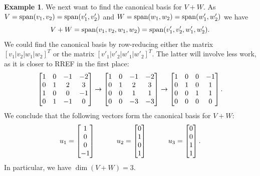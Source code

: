 \documentclass[reqno]{amsart}
\theoremstyle{definition}
\newtheorem{example}[theorem]{Example}
\begin{document}
\begin{example}
 We next want to find the canonical basis for $V+W$.  As
 $V=\operatorname{span}(v_1,v_2)=\operatorname{span}(v'_1,v'_2)$ and
 $W=\operatorname{span}(w_1,w_2)=\operatorname{span}(w'_1,w'_2)$ we have
 \[ V+W = \operatorname{span}(v_1,v_2,w_1,w_2) = \operatorname{span}(v'_1,v'_2,w'_1,w'_2). \]
 We could find the canonical basis by row-reducing either the matrix
 $[v_1|v_2|w_1|w_2]^T$ or the matrix $[v'_1|v'_2|w'_1|w'_2]^T$.  The
 latter will involve less work, as it is closer to RREF in the first
 place:
 \[
  \left[\begin{matrix}
    1 &  0 & -1 & -2 \\
    0 &  1 &  2 &  3 \\
    1 &  0 &  0 & -1 \\
    0 &  1 & -1 &  0
  \end{matrix}\right]
  \to
  \left[\begin{matrix}
    1 &  0 & -1 & -2 \\
    0 &  1 &  2 &  3 \\
    0 &  0 &  1 &  1 \\
    0 &  0 & -3 & -3
  \end{matrix}\right]
  \to
  \left[\begin{matrix}
    1 &  0 &  0 & -1 \\
    0 &  1 &  0 &  1 \\
    0 &  0 &  1 &  1 \\
    0 &  0 &  0 &  0
  \end{matrix}\right].
 \]
 We conclude that the following vectors form the canonical basis for
 $V+W$:
 \[ u_1 = \left[\begin{matrix} 1 \\ 0 \\ 0 \\ -1 \end{matrix}\right] \hspace{3em}
    u_2 = \left[\begin{matrix} 0 \\ 1 \\ 0 \\  1 \end{matrix}\right] \hspace{3em}
    u_3 = \left[\begin{matrix} 0 \\ 0 \\ 1 \\  1 \end{matrix}\right].
 \]
 In particular, we have $\dim(V+W)=3$.


\end{example}
\end{document}

